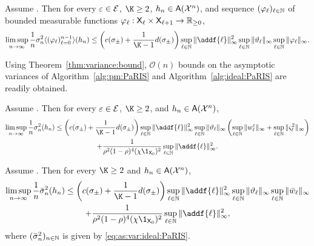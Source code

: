 
\begin{theorem} \label{thm:variance:bound}
Assume . 
Then for every $\varepsilon \in \mathcal{E}$, $\K \geq 2$, $h_n \in \mathsf{A}(\mathcal{X}^n)$, and sequence $(\varphi_\ell)_{\ell \in \mathbb{N}}$ of bounded measurable functions $\varphi_\ell : \mathsf{X}_\ell \times \mathsf{X}_{\ell + 1} \to \mathbb{R}_{\geq 0}$, 
$$
\limsup_{n \to \infty} \frac{1}{n} \sigma^2_n \langle (\varphi_\ell)_{\ell = 0}^{n - 1} \rangle (h_n) 
\leq \left( \cbound + \frac{1}{\K - 1} \dbound \right) 
\sup_{\ell \in \nset} \| \addf{\ell} \|_\infty^2 \sup_{\ell \in \nset} \| \adjfuncforward{\ell} \|_\infty \sup_{\ell \in \nset} \| \varphi_\ell \|_\infty.  
$$
\end{theorem}

Using Theorem~\ref{thm:variance:bound}, $\mathcal{O}(n)$ bounds on the asymptotic variances of Algorithm~\ref{alg:pm:PaRIS} and Algorithm~\ref{alg:ideal:PaRIS} are readily obtained. 

\begin{corollary} \label{cor:variance:bound}
Assume . Then for every $\varepsilon \in \mathcal{E}$, $\K \geq 2$, and $h_n \in \mathsf{A}(\mathcal{X}^n)$, 
\begin{multline} \label{eq:variance:bound:full:monty}
\limsup_{n \to \infty} \frac{1}{n} \sigma^2_n(h_n) 
\leq \left( \cbound + \frac{1}{\K - 1} \dbound \right) \sup_{\ell \in \nset} \| \addf{\ell} \|_\infty^2 \sup_{\ell \in \nset} \| \adjfuncforward{\ell} \|_\infty  \left( \sup_{\ell \in \nset} \| \wgtfuncmod{\ell} \|_\infty + \sup_{\ell \in \nset} \| \ukestvar{\ell} \|_\infty \right) \\
+ \frac{1}{\rho^2(1 - \rho)^4 (\chi \1_{\Xset_0})^2} \sup_{\ell \in \nset} \| \addf{\ell} \|_\infty^2. 
\end{multline}
\end{corollary}

\begin{corollary} \label{cor:variance:bound:ideal:PaRIS}
Assume . Then for every $\K \geq 2$ and $h_n \in \mathsf{A}(\mathcal{X}^n)$, 
\begin{multline*}
\limsup_{n \to \infty} \frac{1}{n} \bar{\sigma}^2_n(h_n) \leq  \left( \cbound + \frac{1}{\K - 1} \dbound \right)
\sup_{\ell \in \nset} \| \addf{\ell} \|_\infty^2 \sup_{\ell \in \nset} \| \adjfuncforward{\ell} \|_\infty \sup_{\ell \in \nset} \| \wgtfuncideal{\ell} \|_\infty \\
+ \frac{1}{\rho^2(1 - \rho)^4 (\chi \1_{\Xset_0})^2} \sup_{\ell \in \nset} \| \addf{\ell} \|_\infty^2,  
\end{multline*}
where $(\bar{\sigma}^2_n)_{n \in \mathbb{N}}$ is given by \eqref{eq:as:var:ideal:PaRIS}. 
\end{corollary}

